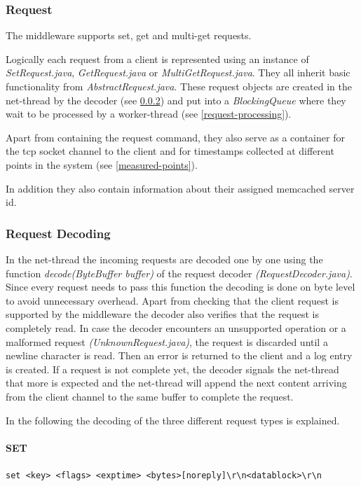 \documentclass[11pt,a4paper]{article}
\begin{document}
\subsubsection{Request}
The middleware supports set, get and multi-get requests.

Logically each request from a client is represented using an instance of \emph{SetRequest.java}, \emph{GetRequest.java} or \emph{MultiGetRequest.java}. They all inherit basic functionality from \emph{AbstractRequest.java}.
These request objects are created in the net-thread by the decoder (see \ref{request-decoding}) and put into a \emph{BlockingQueue} where they wait to be processed by a worker-thread (see \ref{request-processing}).

Apart from containing the request command, they also serve as a container for the tcp socket channel to the client and for timestamps collected at different points in the system (see \ref{measured-points}).

In addition they also contain information about their assigned memcached server id.

\subsubsection{Request Decoding}\label{request-decoding}
In the net-thread the incoming requests are decoded one by one using the function \emph{decode(ByteBuffer buffer)} of the request decoder \emph{(RequestDecoder.java)}.
Since every request needs to pass this function the decoding is done on byte level to avoid unnecessary overhead.
Apart from checking that the client request is supported by the middleware the decoder also verifies that the request is completely read. In case the decoder encounters an unsupported operation or a malformed request \emph{(UnknownRequest.java)}, the request is discarded until a newline character is read. Then an error is returned to the client and a log entry is created. If a request is not complete yet, the decoder signals the net-thread that more is expected and the net-thread will append the next content arriving from the client channel to the same buffer to complete the request.

In the following the decoding of the three different request types is explained. 

\paragraph{SET} \texttt{set <key> <flags> <exptime> <bytes>[noreply]\textbackslash r\textbackslash n<datablock>\textbackslash r\textbackslash n} 
\end{document}
